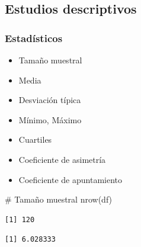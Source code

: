 \documentclass[
  a4paper,
]{scrreport}
\newenvironment{Shaded}{\begin{snugshade}}{\end{snugshade}}
\newcommand{\AttributeTok}[1]{\textcolor[rgb]{0.40,0.45,0.13}{#1}}
\newcommand{\CommentTok}[1]{\textcolor[rgb]{0.37,0.37,0.37}{#1}}
\newcommand{\ConstantTok}[1]{\textcolor[rgb]{0.56,0.35,0.01}{#1}}
\newcommand{\FunctionTok}[1]{\textcolor[rgb]{0.28,0.35,0.67}{#1}}
\newcommand{\NormalTok}[1]{\textcolor[rgb]{0.00,0.23,0.31}{#1}}
\newcommand{\SpecialCharTok}[1]{\textcolor[rgb]{0.37,0.37,0.37}{#1}}
\providecommand{\tightlist}{%
  \setlength{\itemsep}{0pt}\setlength{\parskip}{0pt}}\usepackage{longtable,booktabs,array}
\theoremstyle{definition}
\theoremstyle{definition}
\theoremstyle{remark}
\begin{document}
\hypertarget{estudios-descriptivos}{%
\subsection{Estudios descriptivos}\label{estudios-descriptivos}}

\hypertarget{estaduxedsticos}{%
\subsubsection{Estadísticos}\label{estaduxedsticos}}

\begin{itemize}
\tightlist
\item
  Tamaño muestral
\item
  Media
\item
  Desviación típica
\item
  Mínimo, Máximo
\item
  Cuartiles
\item
  Coeficiente de asimetría
\item
  Coeficiente de apuntamiento
\end{itemize}

\begin{Shaded}
\begin{Highlighting}[]
\CommentTok{\# Tamaño muestral}
\FunctionTok{nrow}\NormalTok{(df)}
\end{Highlighting}
\end{Shaded}

\begin{verbatim}
[1] 120
\end{verbatim}

\begin{Shaded}
\end{Shaded}

\begin{verbatim}
[1] 6.028333
\end{verbatim}

\begin{Shaded}
\end{Shaded}
\end{document}

